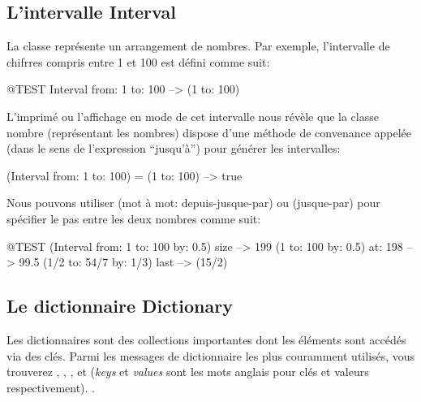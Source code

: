 \documentclass[a4paper,10pt,twoside]{book}
\begin{document}

\subsection{L'intervalle Interval}
La classe  repr\'esente un arrangement de nombres.
Par exemple, l'intervalle de chifrres compris entre 1 et 100 est d\'efini comme
suit:
\begin{code}{@TEST}
Interval from: 1 to: 100 --> (1 to: 100)
\end{code}

\noindent
L'imprim\'e ou l'affichage en mode  de
cet intervalle nous r\'ev\`ele que la classe nombre  (repr\'esentant les nombres) dispose d'une m\'ethode de convenance appel\'ee  (dans le sens de l'expression ``jusqu'\`a'') pour g\'en\'erer les intervalles:

\begin{code}{}
(Interval from: 1 to: 100) = (1 to: 100) --> true
\end{code}

Nous pouvons utiliser  (mot \`a mot: depuis-jusque-par) ou
 (jusque-par) pour sp\'ecifier le pas entre les deux nombres comme suit:

\begin{code}{@TEST}
(Interval from: 1 to: 100 by: 0.5) size --> 199
(1 to: 100 by: 0.5) at: 198 --> 99.5
(1/2 to: 54/7 by: 1/3) last --> (15/2)
\end{code}

\subsection{Le dictionnaire Dictionary}
Les dictionnaires sont des collections importantes dont les \'el\'ements
sont acc\'ed\'es via des cl\'es.
Parmi les messages de dictionnaire les plus couramment utilis\'es, vous
trouverez  
, , ,  et  (\emph{keys} et \emph{values} sont les mots anglais pour cl\'es et valeurs respectivement).
.
\end{document}
